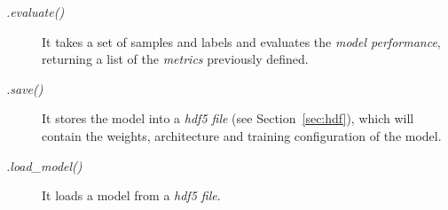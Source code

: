\begin{description}
	\item[\textit{.evaluate()}] It takes a set of samples and labels and evaluates the \emph{model performance}, returning a list of the \textit{metrics} previously defined.
\end{description}

\begin{description}
	\item[\textit{.save()}] It stores the model into a \emph{\gls{hdf5} file} (see Section~\ref{sec:hdf}), which will contain the weights, architecture and training configuration of the model.
\end{description}

\begin{description}
	\item[\textit{.load\_model()}] It loads a model from a \emph{\gls{hdf5} file}.
\end{description}


